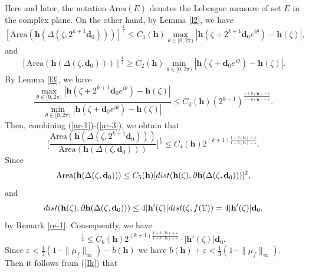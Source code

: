 \documentclass[11pt]{amsart}
\theoremstyle{remark}
\theoremstyle{claim}
\theoremstyle{definition}
\theoremstyle{problem}
\theoremstyle{conjecture}
\theoremstyle{question}
\numberwithin{equation}{section}
\begin{document}
Here and later, the notation ${\text{Area}}(E)$ denotes the Lebesgue measure of set $E$ in the complex plane.  On the other hand, by Lemma \ref{l2}, we have
\begin{equation}\label{ar-1}
[{\text {Area}}(\mathbf{h}(\Delta(\zeta, 2^{k+1}\mathbf{d}_0)))]^{\frac{1}{2}}\leq C_1(\mathbf{h}) \max\limits_{\theta\in [0, 2\pi)}|\mathbf{h}(\zeta+2^{k+1}\mathbf{d}_0e^{i\theta})-\mathbf{h}(\zeta)|,
\end{equation}
and
\begin{equation}\label{ar-2}
[{\text {Area}}(\mathbf{h}(\Delta(\zeta, \mathbf{d}_0)))]^{\frac{1}{2}}\geq C_2(\mathbf{h}) \min\limits_{\theta\in [0, 2\pi)}|\mathbf{h}(\zeta+\mathbf{d}_0e^{i\theta})-\mathbf{h}(\zeta)|.
\end{equation}
By Lemma \ref{l3}, we have
\begin{equation}\label{ar-3}
\frac{ \max\limits_{\theta\in [0, 2\pi)}|\mathbf{h}(\zeta+2^{k+1}\mathbf{d}_0e^{i\theta})-\mathbf{h}(\zeta)|}{\min\limits_{\theta\in [0, 2\pi)}|\mathbf{h}(\zeta+\mathbf{d}_0e^{i\theta})-\mathbf{h}(\zeta)|}
\leq C_3(\mathbf{h})(2^{k+1})^{\frac{1+b(\mathbf{h})+\varepsilon}{1-b(\mathbf{h})-\varepsilon}}.
\end{equation}
Then, combining (\ref{ar-1})-(\ref{ar-3}), we obtain that
\begin{equation}
\Big[\frac{{\text {Area}}(\mathbf{h}(\Delta(\zeta, 2^{k+1}\mathbf{d}_0)))}
{{\text {Area}}(\mathbf{h}(\Delta(\zeta, \mathbf{d}_0)))}\Big]^{\frac{1}{2}} \leq C_4(\mathbf{h}) 2^{(k+1)\frac{1+b(\mathbf{h})+\varepsilon}{1-b(\mathbf{h})-\varepsilon}}. \nonumber
\end{equation}
Since
$$ {\text {Area}}(\mathbf{h}(\Delta(\zeta, \mathbf{d}_0))) \leq C_5(\mathbf{h}) [{\textup{dist}}(\mathbf{h}(\zeta), \partial \mathbf{h}(\Delta(\zeta, \mathbf{d}_0)))]^2, $$
and
\begin{equation}
{\textup{dist}}(\mathbf{h}(\zeta), \partial {\mathbf{h}}(\Delta(\zeta, \mathbf{d}_0))) \leq 4 |{\mathbf{h}}'(\zeta)| {\textup{dist}}(\zeta, f(\mathbb{T}))=4 |{\mathbf{h}}'(\zeta)|\mathbf{d}_0, \nonumber
\end{equation}
by Remark \ref{re-1}. Consequently, we have
\begin{equation}
[{\text {Area}}(\mathbf{h}(\Delta(\zeta, 2^{k+1}\mathbf{d}_0)))]^{\frac{1}{2}} \leq  C_6(\mathbf{h}) 2^{(k+1) \frac{1+b(\mathbf{h})+\varepsilon}{1-b(\mathbf{h})-\varepsilon}}\cdot |{\mathbf{h}}'(\zeta)|\mathbf{d}_0.
\nonumber
\end{equation}
Since $\varepsilon<\frac{1}{3}(1-\|\mu_f\|_{\infty})-b(\mathbf{h})$ we have $b(\mathbf{h})+\varepsilon < \frac{1}{3}(1-\|\mu_f\|_{\infty})$. Then it follows from (\ref{Ik}) that
\end{document}

